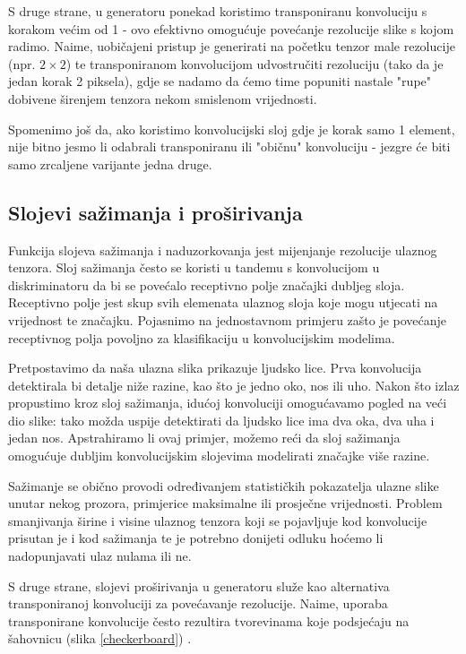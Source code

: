 S druge strane, u generatoru ponekad koristimo transponiranu konvoluciju s korakom većim od 1 - ovo efektivno omogućuje povećanje rezolucije slike s kojom radimo. Naime, uobičajeni pristup je generirati na početku tenzor male rezolucije (npr. $2 \times 2$) te transponiranom konvolucijom udvostručiti rezoluciju (tako da je jedan korak 2 piksela), gdje se nadamo da ćemo time popuniti nastale "rupe" dobivene širenjem tenzora nekom smislenom vrijednosti. 

Spomenimo još da, ako koristimo konvolucijski sloj gdje je korak samo 1 element, nije bitno jesmo li odabrali transponiranu ili "običnu" konvoluciju - jezgre će biti samo zrcaljene varijante jedna druge. 

\pagebreak
\subsection{Slojevi sažimanja i proširivanja}
Funkcija slojeva sažimanja i naduzorkovanja jest mijenjanje rezolucije ulaznog tenzora. Sloj sažimanja često se koristi u tandemu s konvolucijom u diskriminatoru da bi se povećalo receptivno polje značajki dubljeg sloja. Receptivno polje jest skup svih elemenata ulaznog sloja koje mogu utjecati na vrijednost te značajku. Pojasnimo na jednostavnom primjeru zašto je povećanje receptivnog polja povoljno za klasifikaciju u konvolucijskim modelima.

Pretpostavimo da naša ulazna slika prikazuje ljudsko lice. Prva konvolucija detektirala bi detalje niže razine, kao što je jedno oko, nos ili uho. Nakon što izlaz propustimo kroz sloj sažimanja, idućoj konvoluciji omogućavamo pogled na veći dio slike: tako možda uspije detektirati da ljudsko lice ima dva oka, dva uha i jedan nos. Apstrahiramo li ovaj primjer, možemo reći da sloj sažimanja omogućuje dubljim konvolucijskim slojevima modelirati značajke više razine.

Sažimanje se obično provodi određivanjem statističkih pokazatelja ulazne slike unutar nekog prozora, primjerice maksimalne ili prosječne vrijednosti. Problem smanjivanja širine i visine ulaznog tenzora koji se pojavljuje kod konvolucije prisutan je i kod sažimanja te je potrebno donijeti odluku hoćemo li nadopunjavati  ulaz nulama ili ne.

S druge strane, slojevi proširivanja u generatoru služe kao alternativa transponiranoj konvoluciji za povećavanje rezolucije. Naime, uporaba transponirane konvolucije često rezultira tvorevinama koje podsjećaju na šahovnicu (slika \ref{checkerboard}) \citep{odena2016deconvolution}. 

